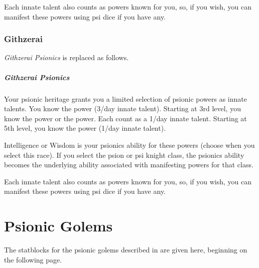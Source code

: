     Each innate talent also counts as powers known for you,
    so, if you wish,
    you can manifest these powers using psi dice if you have any.

\subsubsection{Githzerai}
\emph{Githzerai Psionics} is replaced as follows.
\subparagraph{Githzerai Psionics}
    Your psionic heritage grants you a limited selection of
    psionic powers as innate talents.    
    You know the  power (3/day innate talent).
    Starting at 3rd level,
    you know the  power or the
     power.
    Each count as a 1/day innate talent.
    Starting at 5th level,
    you know the  power (1/day innate talent).

    Intelligence or Wisdom is your psionics ability for these powers
    (choose when you select this race).
    If you select the psion or psi knight class,
    the psionics ability becomes the underlying ability
    associated with manifesting powers for that class.

    Each innate talent also counts as powers known for you,
    so, if you wish,
    you can manifest these powers using psi dice if you have any.

\section{Psionic Golems}
\label{sec:psionic_golem}
The statblocks for the psionic golems described in
are given here, beginning on the following page.

\clearpage

